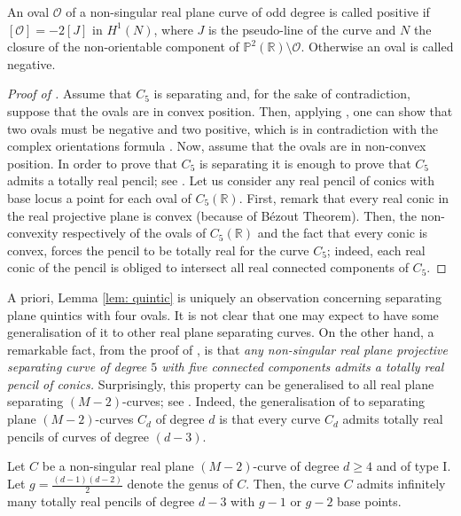  
\begin{defn}
	\label{defn: pos_neg_oval}
An oval $\mathcal O$ of a non-singular real plane curve of odd degree is called positive if $[\mathcal O]= -2[J]$ in $H^1(N)$, where $J$ is the pseudo-line of the curve and $N$ the closure of the non-orientable component of $\mathbb P^2(\mathbb R) \setminus \mathcal O$. Otherwise an oval is called negative. 
\end{defn}

\begin{proof}[Proof of ]
 Assume that $C_5$ is separating and, for the sake of contradiction, suppose that the ovals are in convex position. Then, applying \cite[Theorem 1]{Fied83}, one can show that two ovals must be negative and two positive, which is in contradiction with the complex orientations formula \cite{Mish75}. Now, assume that the ovals are in non-convex position. In order to prove that $C_5$ is separating it is enough to prove that $C_5$ admits a totally real pencil; see . Let us consider any real pencil of conics with base locus a point for each oval of $C_5(\mathbb R)$. 
 First, remark that every real conic in the real projective plane is convex (because of B\'ezout Theorem). Then, the non-convexity respectively of the ovals of $C_5(\mathbb R)$ and the fact that every conic is convex, forces the pencil to be totally real for the curve $C_5$; indeed, each real conic of the pencil is obliged to intersect all real connected components of $C_5$.
\end{proof} 

A priori, Lemma \ref{lem: quintic} is uniquely an observation concerning separating plane quintics with four ovals. It is not clear that one may expect to have some generalisation of it to other real plane separating curves. On the other hand, a remarkable fact, from the proof of , is that \textit{any non-singular real plane projective separating curve of degree $5$ with five connected components admits a totally real pencil of conics.} Surprisingly, this property can be generalised to all real plane separating $(M-2)$-curves; see . Indeed, the generalisation of  to separating plane $(M-2)$-curves $C_d$ of degree $d$ is that every curve $C_d$ admits totally real pencils of curves of degree $(d-3)$.
\begin{thm}
	\label{thm: unico}
	Let $C$ be a non-singular real plane $(M-2)$-curve of degree $d \geq 4$ and of type I. Let $g=\frac{(d-1)(d-2)}{2}$ denote the genus of $C$. Then, the curve $C$ admits infinitely many totally real pencils of degree $d-3$ with $g-1$ or $g-2$ base points.
	\end{thm}

